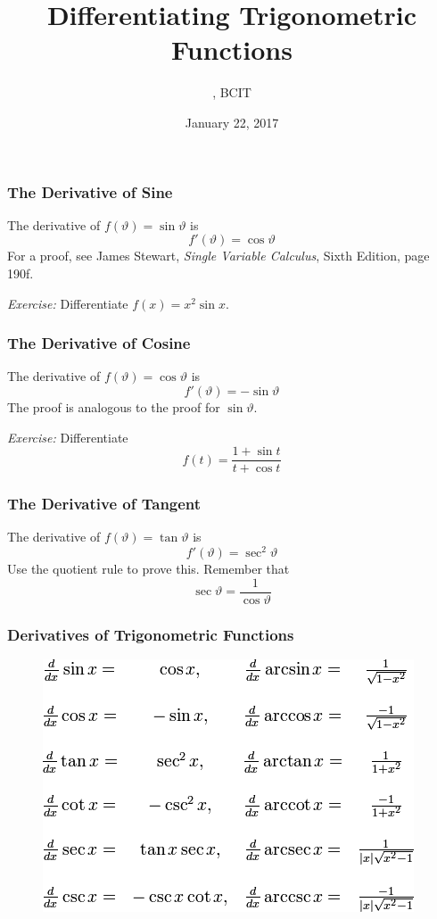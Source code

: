 \documentclass[xcolor=dvipsnames]{beamer}
\title{Differentiating Trigonometric Functions}
\subtitle{{\CourseNumber}, BCIT}
\author{\CourseName}
\date{January 22, 2017}
\begin{document}
\begin{frame}
  \titlepage
\end{frame}

\begin{frame}
  \frametitle{The Derivative of Sine}
The derivative of $f(\vartheta)=\sin\vartheta$ is 
\begin{equation}
  \label{eq:eishooro}
  f'(\vartheta)=\cos\vartheta
\end{equation}
For a proof, see James Stewart, \emph{Single Variable Calculus}, Sixth
Edition, page 190f.

\emph{Exercise:} Differentiate $f(x)=x^{2}\sin{}x$.
\end{frame}

\begin{frame}
  \frametitle{The Derivative of Cosine}
The derivative of $f(\vartheta)=\cos\vartheta$ is 
\begin{equation}
  \label{eq:ahfiefev}
  f'(\vartheta)=-\sin\vartheta
\end{equation}
The proof is analogous to the proof for $\sin{}\vartheta$.

\emph{Exercise:} Differentiate 
\begin{equation}
  \label{eq:afeizeix}
  f(t)=\frac{1+\sin{}t}{t+\cos{}t}
\end{equation}
\end{frame}

\begin{frame}
  \frametitle{The Derivative of Tangent}
The derivative of $f(\vartheta)=\tan\vartheta$ is 
\begin{equation}
  \label{eq:uulohjeo}
  f'(\vartheta)=\sec^{2}\vartheta
\end{equation}
Use the quotient rule to prove this. Remember that 
\begin{equation}
  \label{eq:shooceid}
  \sec\vartheta=\frac{1}{\cos\vartheta}
\end{equation}
\end{frame}

\begin{frame}
  \frametitle{Derivatives of Trigonometric Functions}
\begin{figure}[h]
\includegraphics[scale=.6]{./diagrams/trigdiff.png}
\end{figure}
\end{frame}
\end{document}
